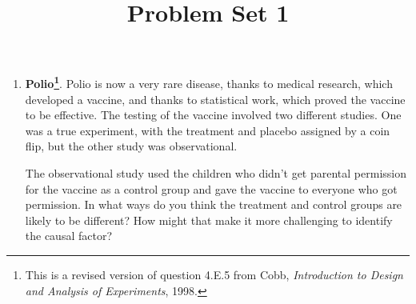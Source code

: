 \documentclass[
  letterpaper,
  DIV=11,
  numbers=noendperiod]{scrartcl}
\title{Problem Set 1}
\author{}
\date{}
\begin{document}
\maketitle


\begin{enumerate}
\def\labelenumi{\arabic{enumi}.}
\item
  \textbf{Polio\footnote{This is a revised version of question 4.E.5
    from Cobb,
    \emph{Introduction to Design and Analysis of Experiments}, 1998.}}.
  Polio is now a very rare disease, thanks to medical research, which
  developed a vaccine, and thanks to statistical work, which proved the
  vaccine to be effective. The testing of the vaccine involved two
  different studies. One was a true experiment, with the treatment and
  placebo assigned by a coin flip, but the other study was
  observational.

  The observational study used the children who didn't get parental
  permission for the vaccine as a control group and gave the vaccine to
  everyone who got permission. In what ways do you think the treatment
  and control groups are likely to be different? How might that make it
  more challenging to identify the causal factor?
\end{enumerate}

\newpage{}
\end{document}
